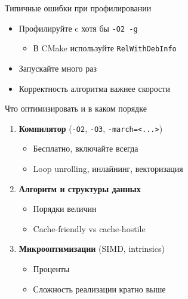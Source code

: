 \documentclass{../../slides-style}
\begin{document}
\begin{frame}{Типичные ошибки при профилировании}
    \begin{itemize}
        \item Профилируйте c хотя бы \texttt{-O2 -g}
              \begin{itemize}
                  \item В CMake используйте \texttt{RelWithDebInfo}
              \end{itemize}

              \bigskip
        \item Запускайте много раз

              \bigskip
        \item Корректность алгоритма важнее скорости

    \end{itemize}
\end{frame}

\begin{frame}{Что оптимизировать и в каком порядке}
    \begin{enumerate}
        \item \textbf{Компилятор} (\texttt{-O2}, \texttt{-O3}, \texttt{-march=<...>})
              \begin{itemize}
                  \item Бесплатно, включайте всегда
                  \item Loop unrolling, инлайнинг, векторизация
              \end{itemize}

              \bigskip
        \item \textbf{Алгоритм и структуры данных}
              \begin{itemize}
                  \item Порядки величин
                  \item Cache-friendly vs cache-hostile
              \end{itemize}

              \bigskip
        \item \textbf{Микрооптимизации} (SIMD, intrinsics)
              \begin{itemize}
                  \item Проценты
                  \item Сложность реализации кратно выше
              \end{itemize}
    \end{enumerate}
\end{frame}
\end{document}
